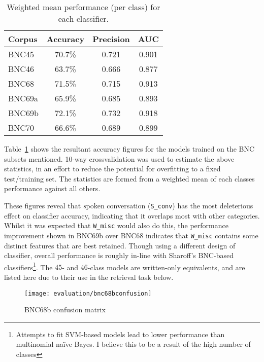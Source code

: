 \begin{table}[ht]
    \centering

    \begin{tabular}{|l|c|c|c|}
        \hline 
        Corpus & Accuracy & Precision & AUC \\
        \hline
        BNC45  &  70.7\%  &  0.721  &  0.901 \\
        BNC46  &  63.7\%  &  0.666  &  0.877 \\
        BNC68  &  71.5\%  &  0.715  &  0.913 \\
        BNC69a &  65.9\%  &  0.685  &  0.893 \\
        BNC69b &  72.1\%  &  0.732  &  0.918 \\
        BNC70  &  66.6\%  &  0.689  &  0.899 \\
        \hline
    \end{tabular}
    \caption{Weighted mean performance (per class) for each classifier.}
    \label{table:evaluation:heuristics:classifieraccuracy}
\end{table}

Table~\ref{table:evaluation:heuristics:classifieraccuracy} shows the resultant accuracy figures for the models trained on the BNC subsets mentioned.  10-way crossvalidation was used to estimate the above statistics, in an effort to reduce the potential for overfitting to a fixed test/training set.  The statistics are formed from a weighted mean of each classes performance against all others.

These figures reveal that {\textsl spoken conversation} (\texttt{S\_conv}) has the most deleterious effect on classifier accuracy, indicating that it overlaps most with other categories.  Whilst it was expected that \texttt{W\_misc} would also do this, the performance improvement shown in BNC69b over BNC68 indicates that \texttt{W\_misc} contains some distinct features that are best retained.  Though using a different design of classifier, overall performance is roughly in-line with Sharoff's BNC-based classifiers\footnote{Attempts to fit SVM-based models lead to lower performance than multinomial na\"ive Bayes.  I believe this to be a result of the high number of classes}\cite{sharoff2007classifying}.  The $45$- and $46$-class models are written-only equivalents, and are listed here due to their use in the retrieval task below.

    

\begin{figure}[ht]
    \centering
    \texttt{[image: evaluation/bnc68bconfusion]}
    \caption{BNC68b confusion matrix}
    \label{fig:evaluation:heuristics:bnc68bconfusion}
\end{figure}



